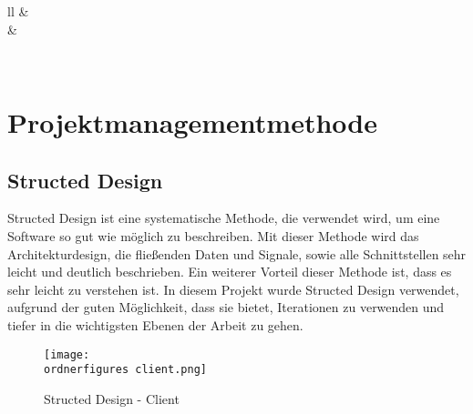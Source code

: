 \begin{longtable}[c]{ll}
	 &  \\ \hline
	 &  \\ \hline
	\caption{Arbeitspakete}
	\label{tb:arbeitspakete}\\
\end{longtable}

\section{Projektmanagementmethode}

\subsection{Structed Design}
Structed Design ist eine systematische Methode, die verwendet wird, um eine Software so gut wie m\"{o}glich zu beschreiben. Mit dieser Methode wird das Architekturdesign, die flie\ss{}enden Daten und Signale, sowie alle Schnittstellen sehr leicht und deutlich beschrieben. Ein weiterer Vorteil dieser Methode ist, dass es sehr leicht zu verstehen ist. In diesem Projekt wurde Structed Design verwendet, aufgrund der guten M\"{o}glichkeit, dass sie bietet, Iterationen zu verwenden und tiefer in die wichtigsten Ebenen der Arbeit zu gehen. 

\label{fi:sd-client }

\begin{figure}[h]
	\centering
	\texttt{[image: \\ordnerfigures
		client.png]}
	\caption{Structed Design - Client}
\end{figure}

